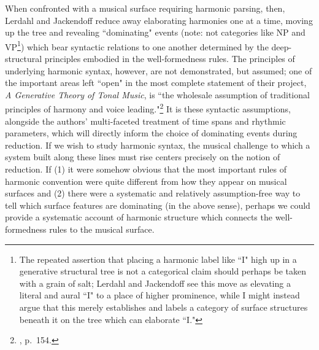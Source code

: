 When confronted with a musical surface requiring harmonic parsing, then, Lerdahl and Jackendoff reduce away elaborating harmonies one at a time, moving up the tree and revealing ``dominating" events (note: not categories like NP and VP\footnote{The repeated assertion that placing a harmonic label like ``I" high up in a generative structural tree is not a categorical claim should perhaps be taken with a grain of salt; Lerdahl and Jackendoff see this move as elevating a literal and aural ``I" to a place of higher prominence, while I might instead argue that this merely establishes and labels a category of surface structures beneath it on the tree which can elaborate ``I."}) which bear syntactic relations to one another determined by the deep-structural principles embodied in the well-formedness rules.  The principles of underlying harmonic syntax, however, are not demonstrated, but assumed; one of the important areas left ``open" in the most complete statement of their project, \emph{A Generative Theory of Tonal Music}, is ``the wholesale assumption of traditional principles of harmony and voice leading."\footnote{\cite{lj1983}, p.\ 154.}  It is these syntactic assumptions, alongside the authors' multi-faceted treatment of time spans and rhythmic parameters, which will directly inform the choice of dominating events during reduction.  If we wish to study harmonic syntax, the musical challenge to which a system built along these lines must rise centers precisely on the notion of reduction.  If (1) it were somehow obvious that the most important rules of harmonic convention were quite different from how they appear on musical surfaces and (2) there were a systematic and relatively assumption-free way to tell which surface features are dominating (in the above sense), perhaps we could provide a systematic account of harmonic structure which connects the well-formedness rules to the musical surface.

